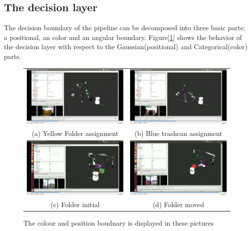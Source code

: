 \documentclass[twoside,hidelinks]{article}
\begin{document}
\subsection{The decision layer}

The decision boundary of the pipeline can be decomposed into three basic parts; a positional, an color and an angular boundary. Figure[\ref{pip:bounds}] shows the behavior of the decision layer with respect to the Gaussian(positional) and Categorical(color) parts. 

\begin{figure}[h!]

\begin{tabular}{cc}
  \includegraphics[width=.5\textwidth]{colorBound} &   \includegraphics[width=.5\textwidth]{colorBound2} \\
(a) Yellow Folder assignment  & (b) Blue trashcan assignment \\[6pt]
	\includegraphics[width=.5\textwidth]{posBound} &   \includegraphics[width=.5\textwidth]{posBound2} \\
(c) Folder initial  & (d) Folder moved \\[6pt]
\end{tabular}
\caption{The colour and position boudnary is displayed in these pictures}
  \label{pip:bounds}
\end{figure}
\end{document}
